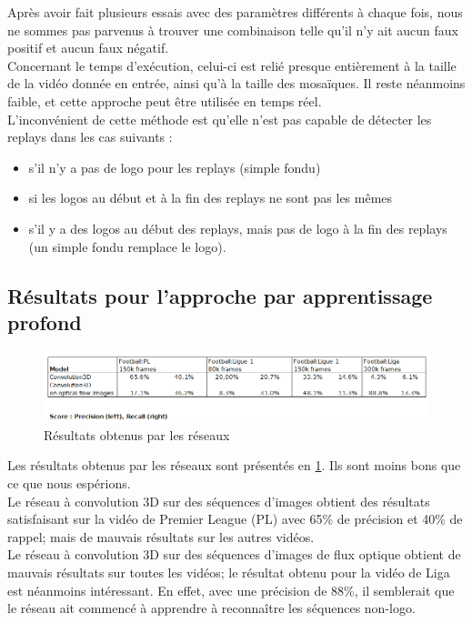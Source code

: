 \documentclass[11pt]{article}
\begin{document}
Après avoir fait plusieurs essais avec des paramètres différents à chaque fois, nous ne sommes pas parvenus à trouver une combinaison telle qu'il n'y ait aucun faux positif et aucun faux négatif.\\

Concernant le temps d’exécution, celui-ci est relié presque entièrement à la taille de la vidéo donnée en entrée, ainsi qu’à la taille des mosaïques. Il reste néanmoins faible, et cette approche peut être utilisée en temps réel.\\

L'inconvénient de cette méthode est qu'elle n'est pas capable de détecter les replays dans les cas suivants :\\
\begin{itemize}
\item s'il n’y a pas de logo pour les replays (simple fondu)\\
\item si les logos au début et à la fin des replays ne sont pas les mêmes\\
\item s'il y a des logos au début des replays, mais pas de logo à la fin des replays (un simple fondu remplace le logo).\\
\end{itemize}

\subsection{Résultats pour l'approche par apprentissage profond}
\label{sec:orgc7252f1}
\begin{figure}[htbp]
\centering
\includegraphics[width=15cm]{res_conv.png}
\caption{Résultats obtenus par les réseaux \label{conv-res}}
\end{figure}
Les résultats obtenus par les réseaux sont présentés en \ref{conv-res}. Ils sont moins bons que ce que nous espérions.\\
Le réseau à convolution 3D sur des séquences d'images obtient des résultats satisfaisant sur la vidéo de Premier League (PL) avec 65\% de précision et 40\% de rappel; mais de mauvais résultats sur les autres vidéos.\\
Le réseau à convolution 3D sur des séquences d'images de flux optique obtient de mauvais résultats sur toutes les vidéos; le résultat obtenu pour la vidéo de Liga est néanmoins intéressant. En effet, avec une précision de 88\%, il semblerait que le réseau ait commencé à apprendre à reconnaître les séquences non-logo.\\
\end{document}

